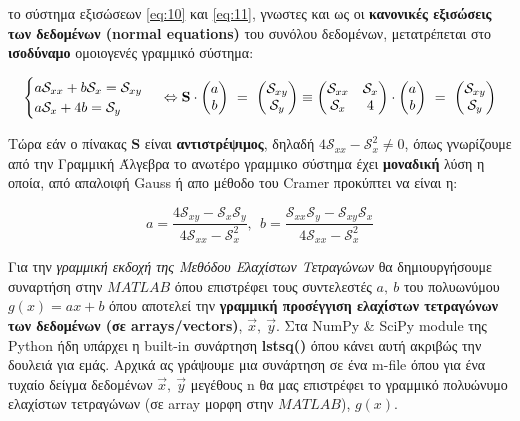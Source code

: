 \documentclass[12pt]{article}
\begin{document}
το σύστημα εξισώσεων \eqref{eq:10} και \eqref{eq:11}, γνωστες και ως οι
\textbf{κανονικές εξισώσεις των δεδομένων (normal equations)} του
συνόλου δεδομένων, μετατρέπεται στο \textbf{ισοδύναμο} ομοιογενές
γραμμικό σύστημα:

\[
\begin{cases}
a\mathcal{S}_{xx}+b\mathcal{S}_{x}=\mathcal{S}_{xy} \\
a\mathcal{S}_{x}+4b=\mathcal{S}_{y} \\
\end{cases} \nonumber \\
\Leftrightarrow \\
\mathbf{S}
\cdot
\begin{pmatrix}
a \\
b \\
\end{pmatrix}
\ = \
\begin{pmatrix}
\mathcal{S}_{xy} \\
\mathcal{S}_{y} \\
\end{pmatrix}
\equiv
\begin{pmatrix}
\mathcal{S}_{xx} & \mathcal{S}_{x} \\
\mathcal{S}_{x} & 4 \\
\end{pmatrix}
\cdot
\begin{pmatrix}
a \\
b \\
\end{pmatrix}
\ = \
\begin{pmatrix}
\mathcal{S}_{xy} \\
\mathcal{S}_{y} \\
\end{pmatrix}
\]

Τώρα εάν ο πίνακας \(\mathbf{S}\) είναι \textbf{αντιστρέψιμος}, δηλαδή
\(4\mathcal{S}_{xx}-\mathcal{S}_{x}^2 \neq 0\), όπως γνωρίζουμε από την
Γραμμική Άλγεβρα το ανωτέρο γραμμικο σύστημα έχει \textbf{μοναδική} λύση
η οποία, από απαλοιφή Gauss ή απο μέθοδο του Cramer προκύπτει να είναι
η:

\[
a=\frac{4\mathcal{S}_{xy}-\mathcal{S}_{x}\mathcal{S}_{y}}{4\mathcal{S}_{xx}-\mathcal{S}_{x}^2}, \ \ b=\frac{\mathcal{S}_{xx}\mathcal{S}_{y}-\mathcal{S}_{xy}\mathcal{S}_{x}}{4\mathcal{S}_{xx}-\mathcal{S}_{x}^2} \nonumber
\]

Για την \emph{γραμμική εκδοχή της Μεθόδου Ελαχίστων Τετραγώνων} θα
δημιουργήσουμε συναρτήση στην \(MATLAB\) όπου επιστρέφει τους
συντελεστές \(a, \ b\) του πολυωνύμου \(g(x)=ax+b\) όπου αποτελεί την
\textbf{γραμμική προσέγγιση ελαχίστων τετραγώνων των δεδομένων (σε
arrays/vectors)}, \(\vec{x}, \ \vec{y}\). Στα NumPy \& SciPy module της
Python ήδη υπάρχει η built-in συνάρτηση \textbf{lstsq()} όπου κάνει αυτή
ακριβώς την δουλειά για εμάς. Aρχικά ας γράψουμε μια συνάρτηση σε ένα
m-file όπου για ένα τυχαίο δείγμα δεδομένων \(\vec{x}, \ \vec{y}\)
μεγέθους n θα μας επιστρέφει το γραμμικό πολυώνυμο ελαχίστων τετραγώνων
(σε array μορφη στην \(MATLAB\)), \(g(x)\).
\end{document}
